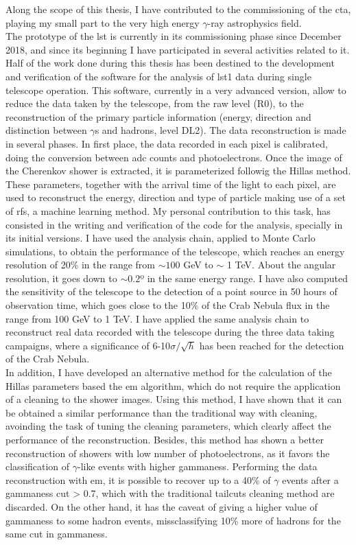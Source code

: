 \documentclass[main.tex]{subfiles}
\begin{document}
\glsresetall

Along the scope of this thesis, I have contributed to the commissioning of the \gls{cta}, playing my small part to the very high energy $\gamma$-ray astrophysics field.\\
The prototype of the \gls{lst} is currently in its commissioning phase since December 2018, and since its beginning I have participated in several activities related to it. Half of the work done during this thesis has been destined to the development and verification of the software for the analysis of \gls{lst}1 data during single telescope operation. This software, currently in a very advanced version, allow to reduce the data taken by the telescope, from the raw level (R0), to the reconstruction of the primary particle information (energy, direction and distinction between $\gamma$s and hadrons, level DL2). The data reconstruction is made in several phases. In first place, the data recorded in each pixel is calibrated, doing the conversion between \gls{adc} counts and photoelectrons. Once the image of the Cherenkov shower is extracted, it is parameterized followig the Hillas method. These parameters, together with the arrival time of the light to each pixel, are used to reconstruct the energy, direction and type of particle making use of a set of \glspl{rf}, a machine learning method. My personal contribution to this task, has consisted in the writing and verification of the code for the analysis, specially in its initial versions. I have used the analysis chain, applied to Monte Carlo simulations, to obtain the performance of the telescope, which reaches an energy resolution of 20\% in the range from $\sim 100$ GeV to $\sim$ 1 TeV. About the angular resolution, it goes down to $\sim 0.2$º in the same energy range. I have also computed the sensitivity of the telescope to the detection of a point source in 50 hours of observation time, which goes close to the 10\% of the Crab Nebula flux in the range from 100 GeV to 1 TeV. I have applied the same analysis chain to reconstruct real data recorded with the telescope during the three data taking campaigns, where a significance of 6-10$\sigma/\sqrt{h}$ has been reached for the detection of the Crab Nebula.\\
In addition, I have developed an alternative method for the calculation of the Hillas parameters based the \gls{em} algorithm, which do not require the application of a cleaning to the shower images. Using this method, I have shown that it can be obtained a similar performance than the traditional way with cleaning, avoinding the task of tuning the cleaning parameters, which clearly affect the performance of the reconstruction. Besides, this method has shown a better reconstruction of showers with low number of photoelectrons, as it favors the classification of $\gamma$-like events with higher gammaness. Performing the data reconstruction with \gls{em}, it is possible to recover up to a 40\% of $\gamma$ events after a gammaness cut > 0.7, which with the traditional tailcuts cleaning method are discarded. On the other hand, it has the caveat of giving a higher value of gammaness to some hadron events, missclassifying 10\% more of hadrons for the same cut in gammaness.\\
\end{document}
